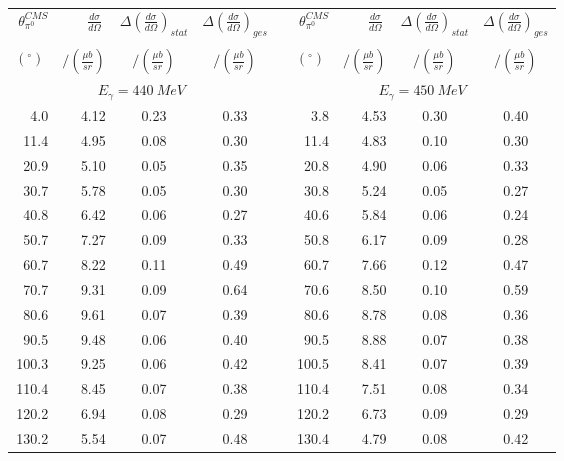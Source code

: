 \begin{table}[htbp] 
\begin{center} 
\begin{tabular}{|r|r|c|c|l|r|r|c|c|} 

\cline{1-4}
\cline{6-9} 
$\theta_{\pi^0}^{CMS}$ & 
$\displaystyle\frac{d\sigma}{d\Omega}\;$ & 
${\Delta}\left( \frac{d\sigma}{d\Omega}\right)_{stat}$ & 
${\Delta}\left( \frac{d\sigma}{d\Omega}\right)_{ges}$ & & 
$\theta_{\pi^0}^{CMS}$ & 
$\displaystyle\frac{d\sigma}{d\Omega}\;$ & 
${\Delta}\left( \frac{d\sigma}{d\Omega}\right)_{stat}$ & 
${\Delta}\left( \frac{d\sigma}{d\Omega}\right)_{ges}$ \\ 
& & & & & & & &\\ 
 $(^{\circ})\;$ & $/(\frac{{\mu}b}{sr})$ & $/(\frac{{\mu}b}{sr})$ & $/(\frac{{\mu}b}{sr})$ & & $(^{\circ})\;$ & $/(\frac{{\mu}b}{sr})$ & $/(\frac{{\mu}b}{sr})$ & $/(\frac{{\mu}b}{sr})$ \\ 
\cline{1-4} 
\cline{6-9} 
\multicolumn{4}{|c|}{ $E_{\gamma}=440~MeV$} & & 
\multicolumn{4}{c|}{ $E_{\gamma}=450~MeV$} \\ 
\cline{1-4} 
\cline{6-9} 
  4.0 &  4.12 &  0.23 &  0.33 & &   3.8 &  4.53 &  0.30 &  0.40 \\ 
 11.4 &  4.95 &  0.08 &  0.30 & &  11.4 &  4.83 &  0.10 &  0.30 \\ 
 20.9 &  5.10 &  0.05 &  0.35 & &  20.8 &  4.90 &  0.06 &  0.33 \\ 
 30.7 &  5.78 &  0.05 &  0.30 & &  30.8 &  5.24 &  0.05 &  0.27 \\ 
 40.8 &  6.42 &  0.06 &  0.27 & &  40.6 &  5.84 &  0.06 &  0.24 \\ 
 50.7 &  7.27 &  0.09 &  0.33 & &  50.8 &  6.17 &  0.09 &  0.28 \\ 
 60.7 &  8.22 &  0.11 &  0.49 & &  60.7 &  7.66 &  0.12 &  0.47 \\ 
 70.7 &  9.31 &  0.09 &  0.64 & &  70.6 &  8.50 &  0.10 &  0.59 \\ 
 80.6 &  9.61 &  0.07 &  0.39 & &  80.6 &  8.78 &  0.08 &  0.36 \\ 
 90.5 &  9.48 &  0.06 &  0.40 & &  90.5 &  8.88 &  0.07 &  0.38 \\ 
100.3 &  9.25 &  0.06 &  0.42 & & 100.5 &  8.41 &  0.07 &  0.39 \\ 
110.4 &  8.45 &  0.07 &  0.38 & & 110.4 &  7.51 &  0.08 &  0.34 \\ 
120.2 &  6.94 &  0.08 &  0.29 & & 120.2 &  6.73 &  0.09 &  0.29 \\ 
130.2 &  5.54 &  0.07 &  0.48 & & 130.4 &  4.79 &  0.08 &  0.42 \\ 

\end{tabular}
\end{center}
\end{table}
